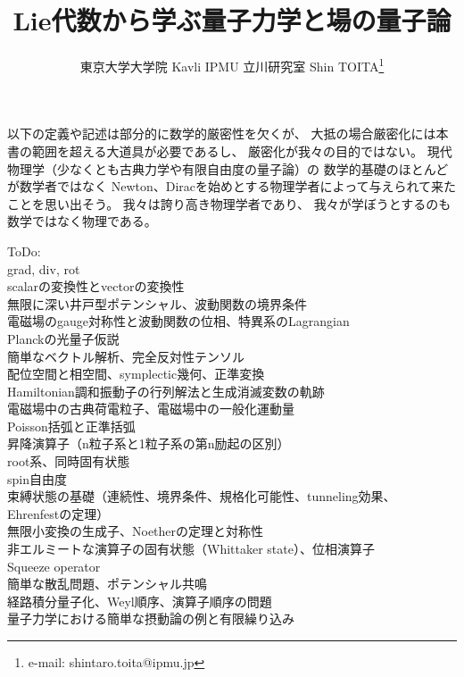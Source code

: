 \documentclass[dvipdfmx]{jsarticle}
\title{Lie代数から学ぶ量子力学と場の量子論}
\author{東京大学大学院 Kavli IPMU 立川研究室 \hspace{15pt}Shin TOITA\thanks{e-mail: shintaro.toita@ipmu.jp}}
\begin{document}
\maketitle
\vspace{-4zh}

\tableofcontents
\newpage

以下の定義や記述は部分的に数学的厳密性を欠くが、
大抵の場合厳密化には本書の範囲を超える大道具が必要であるし、
厳密化が我々の目的ではない。
現代物理学（少なくとも古典力学や有限自由度の量子論）の
数学的基礎のほとんどが数学者ではなく
Newton、Diracを始めとする物理学者によって与えられて来たことを思い出そう。
我々は誇り高き物理学者であり、
我々が学ぼうとするのも数学ではなく物理である。

ToDo:
\\grad, div, rot
\\scalarの変換性とvectorの変換性
\\無限に深い井戸型ポテンシャル、波動関数の境界条件
\\電磁場のgauge対称性と波動関数の位相、特異系のLagrangian
\\Planckの光量子仮説 
\\簡単なベクトル解析、完全反対性テンソル
\\配位空間と相空間、symplectic幾何、正準変換
\\Hamiltonian調和振動子の行列解法と生成消滅変数の軌跡
\\電磁場中の古典荷電粒子、電磁場中の一般化運動量
\\Poisson括弧と正準括弧
\\昇降演算子（n粒子系と1粒子系の第n励起の区別）
\\root系、同時固有状態
\\spin自由度
\\束縛状態の基礎（連続性、境界条件、規格化可能性、tunneling効果、
\\Ehrenfestの定理）
\\無限小変換の生成子、Noetherの定理と対称性
\\非エルミートな演算子の固有状態（Whittaker state）、位相演算子
\\Squeeze operator
\\簡単な散乱問題、ポテンシャル共鳴
\\経路積分量子化、Weyl順序、演算子順序の問題
\\量子力学における簡単な摂動論の例と有限繰り込み

\newpage

\newpage

\newpage

\newpage

\end{document}
